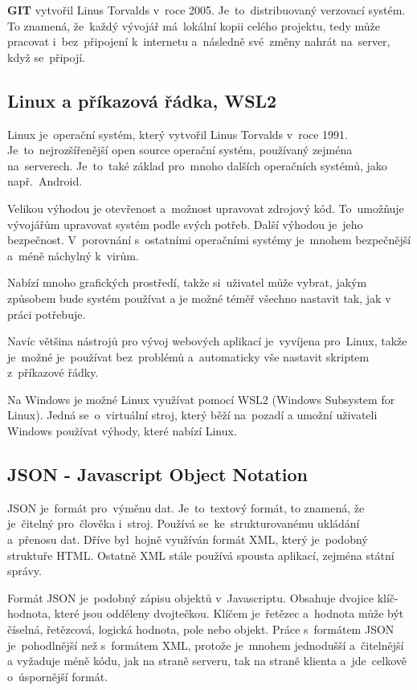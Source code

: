 \documentclass[14pt]{article}
\begin{document}
        \textbf{GIT} vytvořil Linus Torvalds v~roce 2005. Je~to~distribuovaný verzovací systém. To znamená, že~každý vývojář má~lokální kopii celého projektu,
        tedy může pracovat i~bez~připojení k~internetu a~následně své~změny nahrát na~server, když se~připojí.

        \subsection{Linux a příkazová řádka, WSL2}
        Linux je~operační systém, který vytvořil Linus Torvalds v~roce 1991. Je~to~nejrozšířenější open source operační systém,
        používaný zejména na~serverech. Je~to~také základ pro~mnoho dalších operačních systémů, jako např.~Android.
        
        Velikou výhodou je otevřenost a~možnost upravovat zdrojový kód. To~umožňuje vývojářům upravovat systém podle svých potřeb.
        Další výhodou je~jeho bezpečnost. V~porovnání s~ostatními operačními systémy je~mnohem bezpečnější a~méně náchylný k~virům.

        Nabízí mnoho grafických prostředí, takže si~uživatel může vybrat, jakým způsobem bude systém používat a je možné téměř
        všechno nastavit tak, jak v práci potřebuje.

        Navíc většina nástrojů pro vývoj webových aplikací je~vyvíjena pro~Linux, takže je~možné je~používat bez~problémů a~automaticky
        vše nastavit skriptem z~příkazové řádky.

        Na Windows je možné Linux využívat pomocí WSL2 (Windows Subsystem for Linux). Jedná se~o~virtuální stroj, který běží na~pozadí
        a umožní uživateli Windows používat výhody, které nabízí Linux.

        \subsection{JSON - Javascript Object Notation}
        JSON je~formát pro~výměnu dat. Je~to~textový formát, to znamená, že je~čitelný pro~člověka i~stroj.
        Používá se~ke~strukturovanému ukládání a~přenosu dat. Dříve byl~hojně využíván formát XML,
        který je~podobný struktuře HTML. Ostatně XML stále používá spousta aplikací, zejména státní správy.

        Formát JSON je~podobný zápisu objektů v~Javascriptu. Obsahuje dvojice klíč-hodnota, které jsou odděleny dvojtečkou.
        Klíčem je~řetězec a~hodnota může být číselná, řetězcová, logická hodnota, pole nebo objekt.
        Práce s~formátem JSON je~pohodlnější než s~formátem XML, protože je~mnohem jednodušší a~čitelnější a vyžaduje méně kódu,
        jak na straně serveru, tak na straně klienta a~jde~celkově o~úspornější formát.
\end{document}

